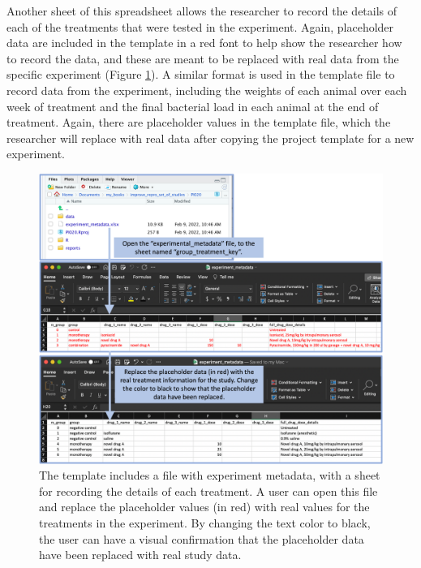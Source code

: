 \documentclass[]{tufte-book}
\begin{document}
Another sheet of this spreadsheet allows the researcher to record the details of
each of the treatments that were tested in the experiment. Again, placeholder
data are included in the template in a red font to help show the researcher how
to record the data, and these are meant to be replaced with real data from the
specific experiment (Figure \ref{fig:replacingplaceholdertreatment2}). A
similar format is used in the template file to record data from the experiment,
including the weights of each animal over each week of treatment and the final
bacterial load in each animal at the end of treatment. Again, there are
placeholder values in the template file, which the researcher will replace with
real data after copying the project template for a new experiment.

\begin{figure}
\includegraphics[width=\textwidth]{figures/project_replacing_placeholder_treatment_data} \caption[The template includes a file with experiment metadata, with a sheet for recording the details of each treatment]{The template includes a file with experiment metadata, with a sheet for recording the details of each treatment. A user can open this file and replace the placeholder values (in red) with real values for the treatments in the experiment. By changing the text color to black, the user can have a visual confirmation that the placeholder data have been replaced with real study data.}\label{fig:replacingplaceholdertreatment2}
\end{figure}
\end{document}
